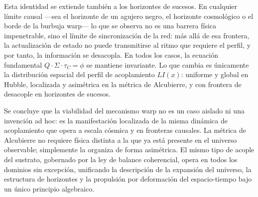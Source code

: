 \documentclass[10pt,a4paper,twocolumn]{article}
\begin{document}
Esta identidad se extiende también a los horizontes de sucesos. En cualquier límite causal —sea el horizonte de un agujero negro, el horizonte cosmológico o el borde de la burbuja warp— lo que se observa no es una barrera física impenetrable, sino el límite de sincronización de la red: más allá de esa frontera, la actualización de estado no puede transmitirse al ritmo que requiere el perfil, y por tanto, la información se desacopla. En todos los casos, la ecuación fundamental \(Q \cdot \Sigma \cdot \tau_C = \phi\) se mantiene invariante. Lo que cambia es únicamente la distribución espacial del perfil de acoplamiento \(LI(x)\): uniforme y global en Hubble, localizada y asimétrica en la métrica de Alcubierre, y con frontera de desacople en horizontes de sucesos.

Se concluye que la viabilidad del mecanismo warp no es un caso aislado ni una invención ad hoc: es la manifestación localizada de la misma dinámica de acoplamiento que opera a escala cósmica y en fronteras causales. La métrica de Alcubierre no requiere física distinta a la que ya está presente en el universo observable; simplemente la organiza de forma asimétrica. El mismo tipo de acople del sustrato, gobernado por la ley de balance coherencial, opera en todos los dominios sin excepción, unificando la descripción de la expansión del universo, la estructura de horizontes y la propulsión por deformación del espacio-tiempo bajo un único principio algebraico.
\end{document}
